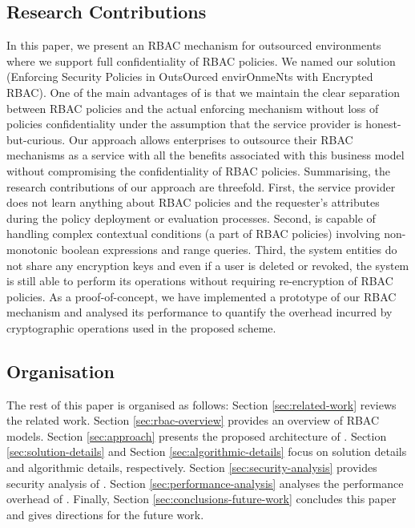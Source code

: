 \documentclass[final,5p,times,twocolumn]{elsarticle}
\begin{document}
\subsection{Research Contributions}
In this paper, we present an RBAC mechanism for outsourced environments where we support full confidentiality of RBAC policies. We named our solution \textbf{} (Enforcing Security Policies in OutsOurced envirOnmeNts with Encrypted RBAC). One of the main advantages of  is that we maintain the clear separation between RBAC policies and the actual enforcing mechanism without loss of policies confidentiality under the assumption that the service provider is honest-but-curious. Our approach allows enterprises to outsource their RBAC mechanisms as a service with all the benefits associated with this business model without compromising the confidentiality of RBAC policies. Summarising, the research contributions of our approach are threefold. First, the service provider does not learn anything about RBAC policies and the requester's attributes during the policy deployment or evaluation processes. Second,  is capable of handling complex contextual conditions (a part of RBAC policies) involving non-monotonic boolean expressions and range queries. Third, the system entities do not share any encryption keys and even if a user is deleted or revoked, the system is still able to perform its operations without requiring re-encryption of RBAC policies. As a proof-of-concept, we have implemented a prototype of our RBAC mechanism and analysed its performance to quantify the overhead incurred by cryptographic operations used in the proposed scheme.

\subsection{Organisation}
The rest of this paper is organised as follows: Section \ref{sec:related-work} reviews the related work. Section \ref{sec:rbac-overview} provides an overview of RBAC models. Section \ref{sec:approach} presents the proposed architecture of . Section \ref{sec:solution-details} and Section \ref{sec:algorithmic-details} focus on solution details and algorithmic details, respectively. Section \ref{sec:security-analysis} provides security analysis of . Section \ref{sec:performance-analysis} analyses the performance overhead of . Finally, Section \ref{sec:conclusions-future-work} concludes this paper and gives directions for the future work.

\iffalse
Section \ref{sec:conclusions-future-work} Conclusions and Future Work
Section \ref{sec:related-work} Related Work
Section \ref{sec:rbac-overview} Overview of RBAC
Section \ref{sec:approach} The  Approach
Section \ref{sec:solution-details} Solution Details
Section \ref{sec:algorithmic-details} Algorithmic Details
Section \ref{sec:security-analysis} Security Analysis
Section \ref{sec:performance-analysis} Performance Analysis
Section \ref{sec:conclusions-future-work} Conclusions and Future Work
\fi
\end{document}
